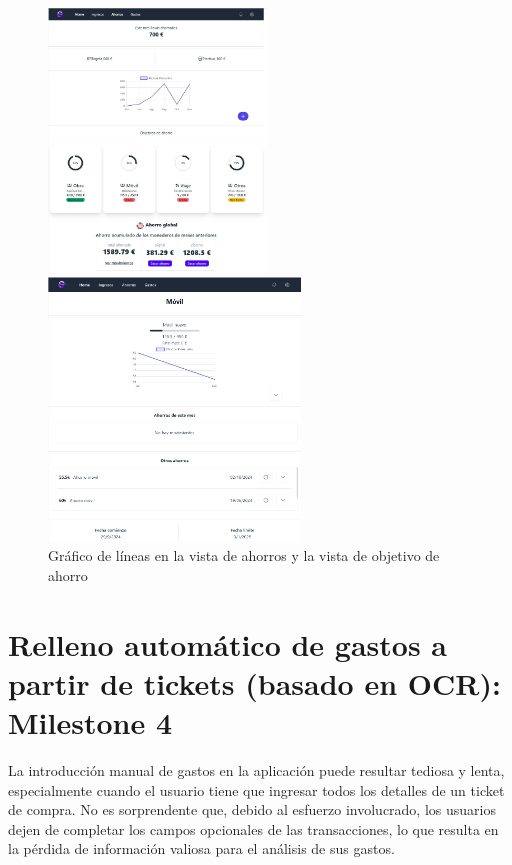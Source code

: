 \begin{figure}[ht!]
    \centering
    \begin{minipage}{0.45\textwidth}
        \centering
        \includegraphics[height=70mm]{imagenes/M3-ahorros.jpg}
    \end{minipage}\hfill
    \begin{minipage}{0.45\textwidth}
        \centering
        \includegraphics[height=70mm]{imagenes/M3-ahorros-objetivo.jpg}
    \end{minipage}
    \caption{Gráfico de líneas en la vista de ahorros y la vista de objetivo de ahorro}
    \label{fig:line_chart}
\end{figure}


\section{Relleno automático de gastos a partir de tickets (basado en OCR): Milestone 4}

La introducción manual de gastos en la aplicación puede resultar tediosa y lenta, especialmente cuando el usuario tiene que ingresar todos los detalles de un ticket de compra. No es sorprendente que, debido al esfuerzo involucrado, los usuarios dejen de completar los campos opcionales de las transacciones, lo que resulta en la pérdida de información valiosa para el análisis de sus gastos.


